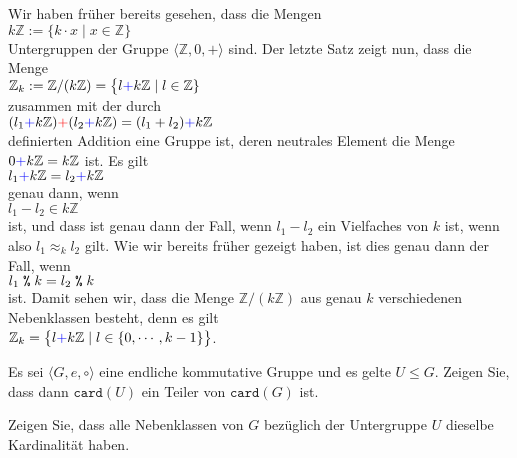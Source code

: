 \example
Wir haben fr\"{u}her bereits gesehen, dass die Mengen 
\\[0.2cm]
\hspace*{1.3cm}
$k\mathbb{Z} := \bigr\{ k \cdot x \mid x \in \mathbb{Z} \bigr\}$
\\[0.2cm]
Untergruppen der Gruppe $\langle \mathbb{Z}, 0, + \rangle$ sind.  Der letzte Satz zeigt nun, dass die Menge
\\[0.2cm]
\hspace*{1.3cm}
$\mathbb{Z}_k := \mathbb{Z}/(k\mathbb{Z}) = \bigl\{ l {\color{blue}{+}} k\mathbb{Z} \mid l \in \mathbb{Z} \}$
\\[0.2cm]
zusammen mit der durch
\\[0.2cm]
\hspace*{1.3cm}
$(l_1 {\color{blue}{+}} k\mathbb{Z}) {\color{red}{+}} (l_2 {\color{blue}{+}} k\mathbb{Z}) = (l_1 + l_2) {\color{blue}{+}} k\mathbb{Z}$
\\[0.2cm]
definierten Addition eine Gruppe ist, deren neutrales Element die Menge $0 {\color{blue}{+}} k\mathbb{Z} = k\mathbb{Z}$ ist.
Es gilt
\\[0.2cm]
\hspace*{1.3cm}
$l_1 {\color{blue}{+}} k\mathbb{Z} = l_2 {\color{blue}{+}} k\mathbb{Z}$
\\[0.2cm]
genau dann, wenn
\\[0.2cm]
\hspace*{1.3cm}
$l_1 - l_2 \in k\mathbb{Z}$
\\[0.2cm]
ist, und dass ist genau dann der Fall, wenn $l_1 - l_2$ ein Vielfaches von $k$ ist, wenn also
$l_1 \approx_k l_2$ gilt.  Wie wir bereits fr\"{u}her gezeigt haben, ist dies genau dann der Fall, wenn
\\[0.2cm]
\hspace*{1.3cm}
$l_1 \;\texttt{\%}\; k = l_2 \;\texttt{\%}\; k$
\\[0.2cm]
ist.  Damit sehen wir, dass die Menge $\mathbb{Z}/(k\mathbb{Z})$ aus genau $k$ verschiedenen Nebenklassen besteht, denn
es gilt
\\[0.2cm]
\hspace*{1.3cm}
$\mathbb{Z}_k = \bigl\{ l {\color{blue}{+}} k\mathbb{Z} \mid l \in \{0, \cdots, k - 1\} \bigr\}$.
\vspace*{0.2cm}

\exercise
Es sei $\langle G, e, \circ \rangle$ eine endliche kommutative Gruppe und es gelte $U \leq G$.
Zeigen Sie, dass dann $\mathtt{card}(U)$ ein Teiler von $\mathtt{card}(G)$ ist. 

\hint
Zeigen Sie, dass alle Nebenklassen von $G$ bez\"{u}glich der Untergruppe $U$ dieselbe
Kardinalit\"{a}t haben.
\eoxs

